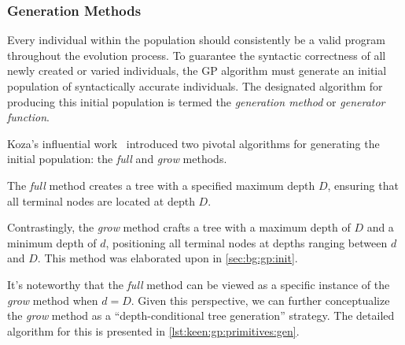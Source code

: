 
\subsubsection{Generation Methods}
\label{sec:keen:gp:primitives:gen}

    Every individual within the population should consistently be a valid program throughout the evolution process. To 
    guarantee the syntactic correctness of 
    all newly created or varied individuals, the GP algorithm must generate an 
    initial population of syntactically accurate individuals. The designated 
    algorithm for producing this initial population is termed the 
    \textit{generation method} or \textit{generator function}.

    Koza's influential work~\autocite{kozaGeneticProgrammingProgramming1992a} 
    introduced two pivotal algorithms for generating the initial population: the 
    \textit{full} and \textit{grow} methods.

    The \emph{full} method creates a tree with a specified maximum depth \(D\), 
    ensuring that all terminal nodes are located at depth \(D\).

    Contrastingly, the \emph{grow} method crafts a tree with a maximum depth of 
    \(D\) and a minimum depth of \(d\), positioning all terminal nodes at depths 
    ranging between \(d\) and \(D\). This method was elaborated upon in 
    \vref{sec:bg:gp:init}.

    It's noteworthy that the \emph{full} method can be viewed as a specific 
    instance of the \emph{grow} method when \(d = D\). Given this perspective, we 
    can further conceptualize the \emph{grow} method as a
    \enquote{depth-conditional tree generation} strategy. The detailed algorithm 
    for this is presented in \vref{lst:keen:gp:primitives:gen}.


